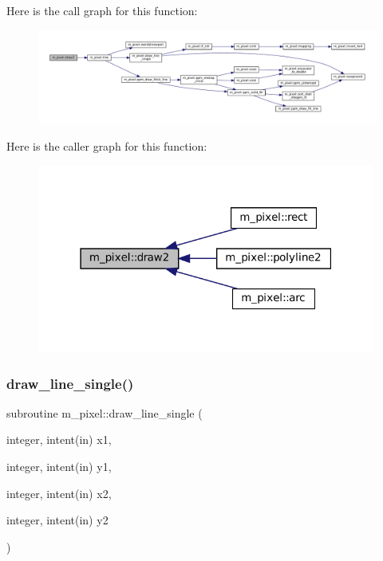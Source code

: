 Here is the call graph for this function\+:
\nopagebreak
\begin{figure}[H]
\begin{center}
\leavevmode
\includegraphics[width=350pt]{namespacem__pixel_a12012e819bb14b27d2b49732aa2e4e55_cgraph}
\end{center}
\end{figure}
Here is the caller graph for this function\+:
\nopagebreak
\begin{figure}[H]
\begin{center}
\leavevmode
\includegraphics[width=315pt]{namespacem__pixel_a12012e819bb14b27d2b49732aa2e4e55_icgraph}
\end{center}
\end{figure}
\mbox{\label{namespacem__pixel_a42791c7e58158616dae7c36ec5806717}} 
\subsubsection{\texorpdfstring{draw\+\_\+line\+\_\+single()}{draw\_line\_single()}}
{\footnotesize\ttfamily subroutine m\+\_\+pixel\+::draw\+\_\+line\+\_\+single (\begin{DoxyParamCaption}\item[{integer, intent(in)}]{x1,  }\item[{integer, intent(in)}]{y1,  }\item[{integer, intent(in)}]{x2,  }\item[{integer, intent(in)}]{y2 }\end{DoxyParamCaption})\hspace{0.3cm}{\ttfamily [private]}}



